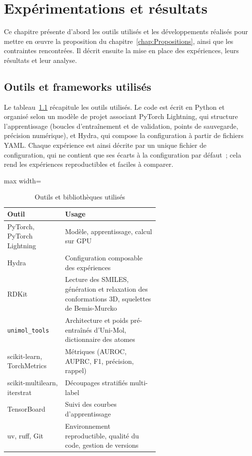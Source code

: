\chapter{Expérimentations et résultats}
\label{chap:Experimentations}

Ce chapitre présente d'abord les outils utilisés et les développements réalisés pour mettre en œuvre la proposition du chapitre~\ref{chap:Propositions}, ainsi que les contraintes rencontrées.
Il décrit ensuite la mise en place des expériences, leurs résultats et leur analyse.


\section{Outils et frameworks utilisés}
\label{sec:Outils}

Le tableau~\ref{tab:Outils} récapitule les outils utilisés.
Le code est écrit en Python et organisé selon un modèle de projet associant PyTorch Lightning, qui structure l'apprentissage (boucles d'entraînement et de validation, points de sauvegarde, précision numérique), et Hydra, qui compose la configuration à partir de fichiers YAML.
Chaque expérience est ainsi décrite par un unique fichier de configuration, qui ne contient que ses écarts à la configuration par défaut~; cela rend les expériences reproductibles et faciles à comparer.

\begin{table}
   \centering
   \begin{adjustbox}{max width=\linewidth}
   \begin{tabular}{|l||p{0.62\linewidth}|}
      \hline
      Outil & Usage \\
      \hline
      \hline
      PyTorch, PyTorch Lightning & Modèle, apprentissage, calcul sur GPU \\
      \hline
      Hydra & Configuration composable des expériences \\
      \hline
      RDKit & Lecture des SMILES, génération et relaxation des conformations 3D, squelettes de Bemis-Murcko \\
      \hline
      \texttt{unimol\_tools} & Architecture et poids pré-entraînés d'Uni-Mol, dictionnaire des atomes \\
      \hline
      scikit-learn, TorchMetrics & Métriques (AUROC, AUPRC, F1, précision, rappel) \\
      \hline
      scikit-multilearn, iterstrat & Découpages stratifiés multi-label \\
      \hline
      TensorBoard & Suivi des courbes d'apprentissage \\
      \hline
      uv, ruff, Git & Environnement reproductible, qualité du code, gestion de versions \\
      \hline
   \end{tabular}
   \end{adjustbox}
   \caption{Outils et bibliothèques utilisés}
   \label{tab:Outils}
\end{table}


